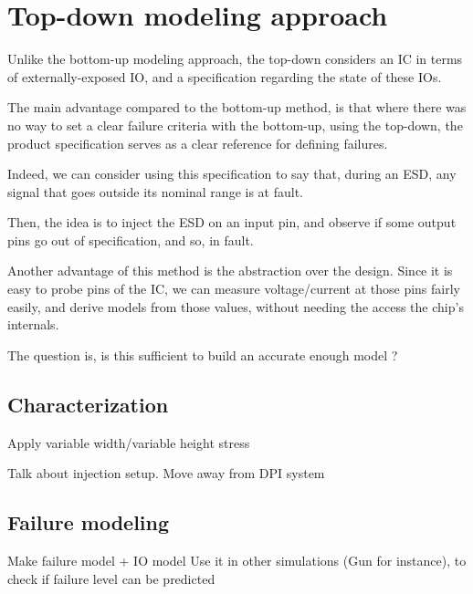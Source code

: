 \section{Top-down modeling approach}

Unlike the bottom-up modeling approach, the top-down considers an IC in terms of
externally-exposed IO, and a specification regarding the state of these IOs.

The main advantage compared to the bottom-up method, is that where there was no
way to set a clear failure criteria with the bottom-up, using the top-down, the
product specification serves as a clear reference for defining failures.

Indeed, we can consider using this specification to say that, during an ESD,
any signal that goes outside its nominal range is at fault.

Then, the idea is to inject the ESD on an input pin, and observe if some output
pins go out of specification, and so, in fault.

Another advantage of this method is the abstraction over the design. Since it is
easy to probe pins of the IC, we can measure voltage/current at those pins fairly
easily, and derive models from those values, without needing the access the chip's internals.

The question is, is this sufficient to build an accurate enough model ?

\subsection{Characterization}
Apply variable width/variable height stress

Talk about injection setup. Move away from DPI system

\subsection{Failure modeling}
Make failure model + IO model
Use it in other simulations (Gun for instance), to check if failure level can be predicted
